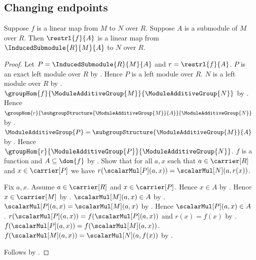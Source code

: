 \subsection{Changing endpoints}

\begin{theorem}\label{linear_map_domain_restriction}
    Suppose $f$ is a linear map from $M$ to $N$ over $R$.
    Suppose $A$ is a submodule of $M$ over $R$.
    Then $\restrl{f}{A}$ is a linear map from
        $\InducedSubmodule{R}{M}{A}$ to $N$ over $R$.
\end{theorem}
\begin{proof}
    Let $P=\InducedSubmodule{R}{M}{A}$ and
        $r=\restrl{f}{A}$.
    $P$ is an exact left module over $R$ by
        .
    Hence $P$ is a left module over $R$.
    $N$ is a left module over $R$ by
        .
    $\groupHom{f}{\ModuleAdditiveGroup{M}}{
        \ModuleAdditiveGroup{N}}$ by
        .
    Hence $\groupHom{r}{
        \subgroupStructure{\ModuleAdditiveGroup{M}}{A}}{
        \ModuleAdditiveGroup{N}}$ by
        .
    $\ModuleAdditiveGroup{P}
        =\subgroupStructure{\ModuleAdditiveGroup{M}}{A}$ by
        .
    Hence $\groupHom{r}{\ModuleAdditiveGroup{P}}{
        \ModuleAdditiveGroup{N}}$.
    $f$ is a function and $A\subseteq\dom{f}$ by
        .
    Show that for all $a,x$ such that $a\in\carrier[R]$ and
        $x\in\carrier[P]$ we have
        $r(\scalarMul[P](a,x))=\scalarMul[N](a,r(x))$.
    \begin{subproof}
        Fix $a,x$.
        Assume $a\in\carrier[R]$ and $x\in\carrier[P]$.
        Hence $x\in A$ by .
        Hence $x\in\carrier[M]$ by
            .
        $\scalarMul[M](a,x)\in A$ by .
        $\scalarMul[P](a,x)=\scalarMul[M](a,x)$ by
            .
        Hence $\scalarMul[P](a,x)\in A$.
        $r(\scalarMul[P](a,x))
            =f(\scalarMul[P](a,x))$ and $r(x)=f(x)$ by
            .
        $f(\scalarMul[P](a,x))=f(\scalarMul[M](a,x))$.
        $f(\scalarMul[M](a,x))=\scalarMul[N](a,f(x))$ by
            .
    \end{subproof}
    Follows by .
\end{proof}


